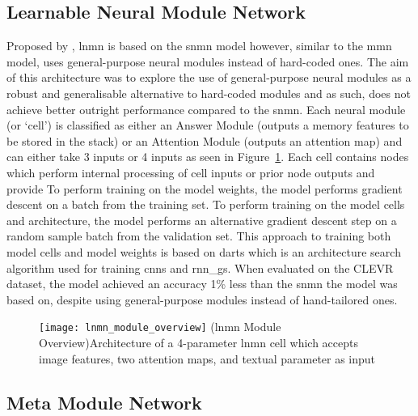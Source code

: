 \subsection{Learnable Neural Module Network}
\label{subsec:learnable_neural_module_network}

Proposed by \citeauthor{pahuja_learning_2019} \cite{pahuja_learning_2019}, \gls{lnmn} is based on the \gls{snmn} model however, similar to the \gls{mmn} model, uses general-purpose neural modules instead of hard-coded ones.
The aim of this architecture was to explore the use of general-purpose neural modules as a robust and generalisable alternative to hard-coded modules and as such, does not achieve better outright performance compared to the \gls{snmn}.
Each neural module (or `cell') is classified as either an Answer Module (outputs a memory features to be stored in the stack) or an Attention Module (outputs an attention map) and can either take 3 inputs or 4 inputs as seen in Figure~\ref{fig:lnmn_module_overview}.
Each cell contains nodes which perform internal processing of cell inputs or prior node outputs and provide
To perform training on the model weights, the model performs gradient descent on a batch from the training set.
To perform training on the model cells and architecture, the model performs an alternative gradient descent step on a random sample batch from the validation set.
This approach to training both model cells and model weights is based on \gls{darts} which is an architecture search algorithm used for training \glspl{cnn} and \glspl{rnn_g}\cite{liu_darts_2019}.
When evaluated on the CLEVR dataset, the model achieved an accuracy 1\% less than the \gls{snmn} the model was based on, despite using general-purpose modules instead of hand-tailored ones.

\begin{figure}[htbp]
    \centering
    \texttt{[image: lnmn\_module\_overview]}
    \captionsource(\acrshort{lnmn} Module Overview){Architecture of a 4-parameter \acrshort{lnmn} cell which accepts image features, two attention maps, and textual parameter as input \label{fig:lnmn_module_overview}}{\citeauthor{pahuja_learning_2019}\cite{pahuja_learning_2019}}
\end{figure}

\subsection{Meta Module Network}
\label{subsec:meta_module_network}

